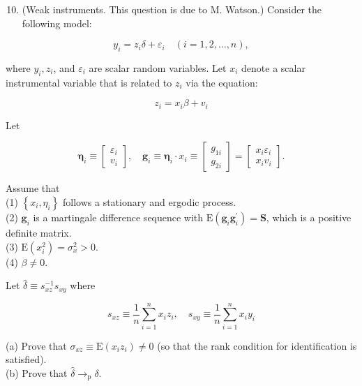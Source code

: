 \documentclass[10pt]{article}
\begin{document}
\begin{enumerate}
  \setcounter{enumi}{9}
  \item (Weak instruments. This question is due to M. Watson.) Consider the following model:
\end{enumerate}

$$
y_{i}=z_{i} \delta+\varepsilon_{i} \quad(i=1,2, \ldots, n),
$$

where $y_{i}, z_{i}$, and $\varepsilon_{i}$ are scalar random variables. Let $x_{i}$ denote a scalar instrumental variable that is related to $z_{i}$ via the equation:

$$
z_{i}=x_{i} \beta+v_{i}
$$

Let

$$
\boldsymbol{\eta}_{i} \equiv\left[\begin{array}{c}
\varepsilon_{i} \\
v_{i}
\end{array}\right], \quad \mathbf{g}_{i} \equiv \boldsymbol{\eta}_{i} \cdot x_{i} \equiv\left[\begin{array}{c}
g_{1 i} \\
g_{2 i}
\end{array}\right]=\left[\begin{array}{c}
x_{i} \varepsilon_{i} \\
x_{i} v_{i}
\end{array}\right] .
$$

Assume that\\
(1) $\left\{x_{i}, \eta_{i}\right\}$ follows a stationary and ergodic process.\\
(2) $\mathbf{g}_{i}$ is a martingale difference sequence with $\mathrm{E}\left(\mathbf{g}_{i} \mathbf{g}_{i}^{\prime}\right)=\mathbf{S}$, which is a positive definite matrix.\\
(3) $\mathrm{E}\left(x_{i}^{2}\right)=\sigma_{x}^{2}>0$.\\
(4) $\beta \neq 0$.

Let $\hat{\delta} \equiv s_{x z}^{-1} s_{x y}$ where

$$
s_{x z} \equiv \frac{1}{n} \sum_{i=1}^{n} x_{i} z_{i}, \quad s_{x y} \equiv \frac{1}{n} \sum_{i=1}^{n} x_{i} y_{i}
$$

(a) Prove that $\sigma_{x z} \equiv \mathrm{E}\left(x_{i} z_{i}\right) \neq 0$ (so that the rank condition for identification is satisfied).\\
(b) Prove that $\hat{\delta} \rightarrow_{\mathrm{p}} \delta$.
\end{document}
